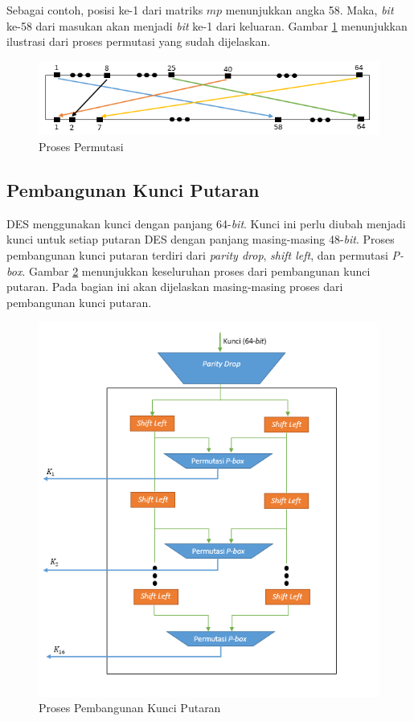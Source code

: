 Sebagai contoh, posisi ke-1 dari matriks \begin{math}mp\end{math} menunjukkan angka 58. Maka, \textit{bit} ke-58 dari masukan akan menjadi \textit{bit} ke-1 dari keluaran. Gambar \ref{fig:prosespermutasi} menunjukkan ilustrasi dari proses permutasi yang sudah dijelaskan.

\begin{figure}[H]
\includegraphics[scale=0.8]{Gambar/proses_permutasi_awal}
\centering
\caption{Proses Permutasi}\label{fig:prosespermutasi}
\end{figure}

\subsection{Pembangunan Kunci Putaran}

DES menggunakan kunci dengan panjang 64-\textit{bit}. Kunci ini perlu diubah menjadi kunci untuk setiap putaran DES dengan panjang masing-masing 48-\textit{bit}. Proses pembangunan kunci putaran terdiri dari \textit{parity drop}, \textit{shift left}, dan permutasi \textit{P-box}. Gambar \ref{fig:keygenerate} menunjukkan keseluruhan proses dari pembangunan kunci putaran. Pada bagian ini akan dijelaskan masing-masing proses dari pembangunan kunci putaran.

\begin{figure}[H]
	\includegraphics[scale=0.7]{Gambar/key_generate}
	\centering
	\caption{Proses Pembangunan Kunci Putaran}\label{fig:keygenerate}
\end{figure}

